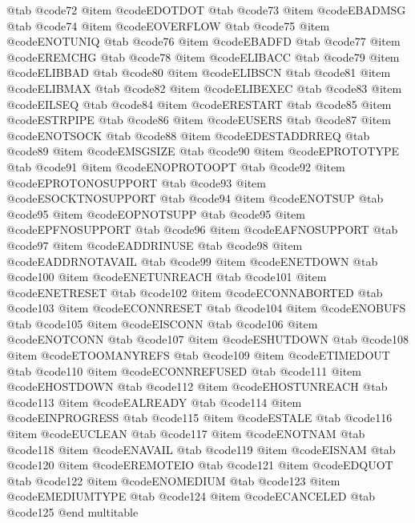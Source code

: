 @tab @code{72}
@item @code{EDOTDOT}
@tab @code{73}
@item @code{EBADMSG}
@tab @code{74}
@item @code{EOVERFLOW}
@tab @code{75}
@item @code{ENOTUNIQ}
@tab @code{76}
@item @code{EBADFD}
@tab @code{77}
@item @code{EREMCHG}
@tab @code{78}
@item @code{ELIBACC}
@tab @code{79}
@item @code{ELIBBAD}
@tab @code{80}
@item @code{ELIBSCN}
@tab @code{81}
@item @code{ELIBMAX}
@tab @code{82}
@item @code{ELIBEXEC}
@tab @code{83}
@item @code{EILSEQ}
@tab @code{84}
@item @code{ERESTART}
@tab @code{85}
@item @code{ESTRPIPE}
@tab @code{86}
@item @code{EUSERS}
@tab @code{87}
@item @code{ENOTSOCK}
@tab @code{88}
@item @code{EDESTADDRREQ}
@tab @code{89}
@item @code{EMSGSIZE}
@tab @code{90}
@item @code{EPROTOTYPE}
@tab @code{91}
@item @code{ENOPROTOOPT}
@tab @code{92}
@item @code{EPROTONOSUPPORT}
@tab @code{93}
@item @code{ESOCKTNOSUPPORT}
@tab @code{94}
@item @code{ENOTSUP}
@tab @code{95}
@item @code{EOPNOTSUPP}
@tab @code{95}
@item @code{EPFNOSUPPORT}
@tab @code{96}
@item @code{EAFNOSUPPORT}
@tab @code{97}
@item @code{EADDRINUSE}
@tab @code{98}
@item @code{EADDRNOTAVAIL}
@tab @code{99}
@item @code{ENETDOWN}
@tab @code{100}
@item @code{ENETUNREACH}
@tab @code{101}
@item @code{ENETRESET}
@tab @code{102}
@item @code{ECONNABORTED}
@tab @code{103}
@item @code{ECONNRESET}
@tab @code{104}
@item @code{ENOBUFS}
@tab @code{105}
@item @code{EISCONN}
@tab @code{106}
@item @code{ENOTCONN}
@tab @code{107}
@item @code{ESHUTDOWN}
@tab @code{108}
@item @code{ETOOMANYREFS}
@tab @code{109}
@item @code{ETIMEDOUT}
@tab @code{110}
@item @code{ECONNREFUSED}
@tab @code{111}
@item @code{EHOSTDOWN}
@tab @code{112}
@item @code{EHOSTUNREACH}
@tab @code{113}
@item @code{EALREADY}
@tab @code{114}
@item @code{EINPROGRESS}
@tab @code{115}
@item @code{ESTALE}
@tab @code{116}
@item @code{EUCLEAN}
@tab @code{117}
@item @code{ENOTNAM}
@tab @code{118}
@item @code{ENAVAIL}
@tab @code{119}
@item @code{EISNAM}
@tab @code{120}
@item @code{EREMOTEIO}
@tab @code{121}
@item @code{EDQUOT}
@tab @code{122}
@item @code{ENOMEDIUM}
@tab @code{123}
@item @code{EMEDIUMTYPE}
@tab @code{124}
@item @code{ECANCELED}
@tab @code{125}
@end multitable
